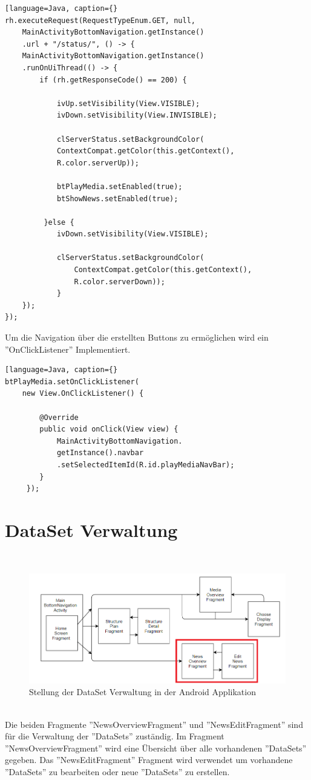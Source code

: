 \begin{lstlisting}[language=Java, caption={}
rh.executeRequest(RequestTypeEnum.GET, null,
	MainActivityBottomNavigation.getInstance()
	.url + "/status/", () -> {   
    MainActivityBottomNavigation.getInstance()
    .runOnUiThread(() -> {
      	if (rh.getResponseCode() == 200) {
        	
           	ivUp.setVisibility(View.VISIBLE);
            ivDown.setVisibility(View.INVISIBLE);
                
            clServerStatus.setBackgroundColor(
           	ContextCompat.getColor(this.getContext(),
           	R.color.serverUp));
                	
            btPlayMedia.setEnabled(true);
            btShowNews.setEnabled(true);
                    
         }else {
         	ivDown.setVisibility(View.VISIBLE);
                    
            clServerStatus.setBackgroundColor(
            	ContextCompat.getColor(this.getContext(),
                R.color.serverDown));
            }
    });
});
\end{lstlisting}
Um die Navigation über die erstellten Buttons zu ermöglichen wird ein ''OnClickListener'' Implementiert.
\begin{lstlisting}[language=Java, caption={}
btPlayMedia.setOnClickListener(
	new View.OnClickListener() {
            
    	@Override
        public void onClick(View view) {
            MainActivityBottomNavigation.
            getInstance().navbar
            .setSelectedItemId(R.id.playMediaNavBar);
        }
     });
\end{lstlisting}
\section{DataSet Verwaltung}
\\
\begin{figure}[H]
\centering
\includegraphics[width=1.0\textwidth]{images/06_AndroidApp/06_AndroidArchShowNews}
\caption{Stellung der DataSet Verwaltung in der Android Applikation}
\label{fig:mediaNav}
\end{figure}
\\
Die beiden Fragmente  ''NewsOverviewFragment'' und ''NewsEditFragment'' sind für die Verwaltung der ''DataSets'' zuständig. Im Fragment ''NewsOverviewFragment'' wird eine Übersicht über alle vorhandenen ''DataSets'' gegeben. Das ''NewsEditFragment'' Fragment wird verwendet um vorhandene ''DataSets'' zu bearbeiten oder neue ''DataSets'' zu erstellen. 
